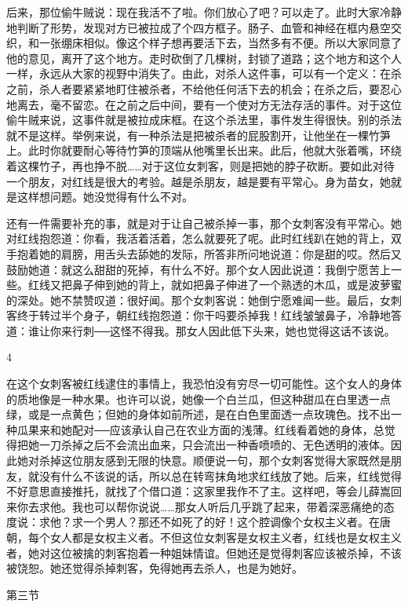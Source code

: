 后来，那位偷牛贼说：现在我活不了啦。你们放心了吧？可以走了。此时大家冷静地判断了形势，发现对方已被拉成了个四方框子。肠子、血管和神经在框内悬空交织，和一张绷床相似。像这个样子想再要活下去，当然多有不便。所以大家同意了他的意见，离开了这个地方。走时砍倒了几棵树，封锁了道路；这个地方和这个人一样，永远从大家的视野中消失了。由此，对杀人这件事，可以有一个定义：在杀之前，杀人者要紧紧地盯住被杀者，不给他任何活下去的机会；在杀之后，要忍心地离去，毫不留恋。在之前之后中间，要有一个使对方无法存活的事件。对于这位偷牛贼来说，这事件就是被拉成床框。在这个杀法里，事件发生得很快。别的杀法就不是这样。举例来说，有一种杀法是把被杀者的屁股割开，让他坐在一棵竹笋上。此时你就要耐心等待竹笋的顶端从他嘴里长出来。此后，他就大张着嘴，环绕着这棵竹子，再也挣不脱……对于这位女刺客，则是把她的脖子砍断。要如此对待一个朋友，对红线是很大的考验。越是杀朋友，越是要有平常心。身为苗女，她就是这样想问题。她没觉得有什么不对。 

还有一件需要补充的事，就是对于让自己被杀掉一事，那个女刺客没有平常心。她对红线抱怨道：你看，我活着活着，怎么就要死了呢。此时红线趴在她的背上，双手抱着她的肩膀，用舌头去舔她的发际，所答非所问地说道：你是甜的哎。然后又鼓励她道：就这么甜甜的死掉，有什么不好。那个女人因此说道：我倒宁愿苦上一些。红线又把鼻子伸到她的背上，就如把鼻子伸进了一个熟透的木瓜，或是波萝蜜的深处。她不禁赞叹道：很好闻。那个女刺客说：她倒宁愿难闻一些。最后，女刺客终于转过半个身子，朝红线抱怨道：你干吗要杀掉我！红线皱皱鼻子，冷静地答道：谁让你来行刺──这怪不得我。那女人因此低下头来，她也觉得这话不该说。 

4 

在这个女刺客被红线逮住的事情上，我恐怕没有穷尽一切可能性。这个女人的身体的质地像是一种水果。也许可以说，她像一个白兰瓜，但这种甜瓜在白里透一点绿，或是一点黄色；但她的身体如前所述，是在白色里面透一点玫瑰色。找不出一种瓜果来和她配对──应该承认自己在农业方面的浅薄。红线看着她的身体，总觉得把她一刀杀掉之后不会流出血来，只会流出一种香喷喷的、无色透明的液体。因此她对杀掉这位朋友感到无限的快意。顺便说一句，那个女刺客觉得大家既然是朋友，就没有什么不该说的话，所以总在转弯抹角地求红线放了她。后来，红线觉得不好意思直接推托，就找了个借口道：这家里我作不了主。这样吧，等会儿薛嵩回来你去求他。我也可以帮你说说……那女人听后几乎跳了起来，带着深恶痛绝的态度说：求他？求一个男人？那还不如死了的好！这个腔调像个女权主义者。在唐朝，每个女人都是女权主义者。不但这位女刺客是女权主义者，红线也是女权主义者，她对这位被擒的刺客抱着一种姐妹情谊。但她还是觉得刺客应该被杀掉，不该被饶恕。她还觉得杀掉刺客，免得她再去杀人，也是为她好。 

第三节 

